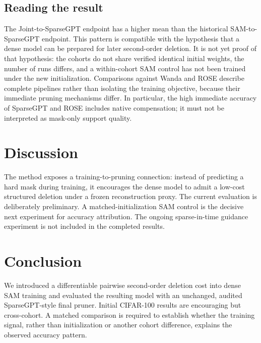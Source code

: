 \documentclass[10pt,a4paper]{article}
\begin{document}
\subsection{Reading the result}
The Joint-to-SparseGPT endpoint has a higher mean than the historical SAM-to-SparseGPT endpoint. This pattern is compatible with the hypothesis that a dense model can be prepared for later second-order deletion. It is not yet proof of that hypothesis: the cohorts do not share verified identical initial weights, the number of runs differs, and a within-cohort SAM control has not been trained under the new initialization. Comparisons against Wanda and ROSE describe complete pipelines rather than isolating the training objective, because their immediate pruning mechanisms differ. In particular, the high immediate accuracy of SparseGPT and ROSE includes native compensation; it must not be interpreted as mask-only support quality.

\section{Discussion}
The method exposes a training-to-pruning connection: instead of predicting a hard mask during training, it encourages the dense model to admit a low-cost structured deletion under a frozen reconstruction proxy. The current evaluation is deliberately preliminary. A matched-initialization SAM control is the decisive next experiment for accuracy attribution. The ongoing sparse-in-time guidance experiment is not included in the completed results.

\section{Conclusion}
We introduced a differentiable pairwise second-order deletion cost into dense SAM training and evaluated the resulting model with an unchanged, audited SparseGPT-style final pruner. Initial CIFAR-100 results are encouraging but cross-cohort. A matched comparison is required to establish whether the training signal, rather than initialization or another cohort difference, explains the observed accuracy pattern.



\end{document}
